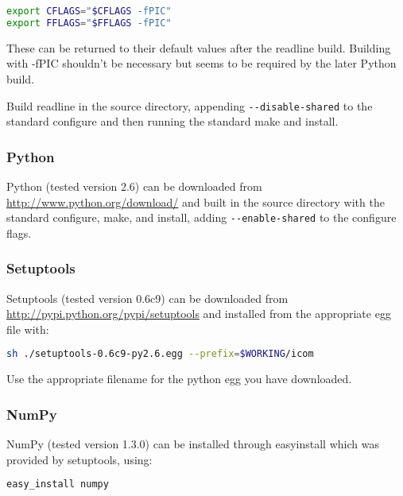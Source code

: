 \begin{lstlisting}[language=bash]
export CFLAGS="$CFLAGS -fPIC"
export FFLAGS="$FFLAGS -fPIC"
\end{lstlisting}

These can be returned to their default values after the readline build.
Building with -fPIC shouldn't be necessary but seems to be required by the
later Python build.

Build readline in the source directory, appending
\lstinline[language=bash]+--disable-shared+ to the standard configure and then
running the standard make and install.

\subsubsection{Python}
\label{sect:required_libraries_python_python}

Python (tested version 2.6) can be downloaded from
\url{http://www.python.org/download/} and built in the source directory with
the standard configure, make, and install, adding
\lstinline[language=bash]+--enable-shared+ to the configure flags.

\subsubsection{Setuptools}
\label{sect:required_libraries_python_setuptools}

Setuptools (tested version 0.6c9) can be downloaded from
\url{http://pypi.python.org/pypi/setuptools} and installed from the appropriate
egg file with:

\begin{lstlisting}[language=bash]
sh ./setuptools-0.6c9-py2.6.egg --prefix=$WORKING/icom
\end{lstlisting}

Use the appropriate filename for the python egg you have downloaded.

\subsubsection{NumPy}
\label{sect:required_libraries_python_numpy}

NumPy (tested version 1.3.0) can be installed through
easy{\textunderscore}install which was provided by setuptools, using:

\begin{lstlisting}[language=bash]
easy_install numpy
\end{lstlisting}

